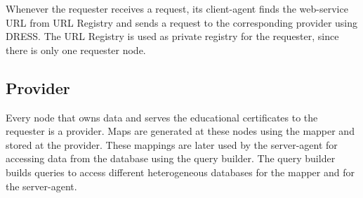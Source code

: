 \documentclass[12pt,a4paper,oneside]{book}
\begin{document}
	Whenever the requester receives a request, its client-agent finds the web-service URL from URL Registry and sends a request to the corresponding provider using DRESS. The URL Registry is used as private registry for the requester, since there is only one requester node.  	

		

	\subsection{Provider}
	Every node that owns data and serves the educational certificates to the requester is a provider. Maps are generated at these nodes using the mapper and stored at the provider. These mappings are later used by the server-agent for accessing data from the database using  the query builder. The query builder builds queries to access different heterogeneous databases for the mapper and for the server-agent.



		
		
		



\end{document}
